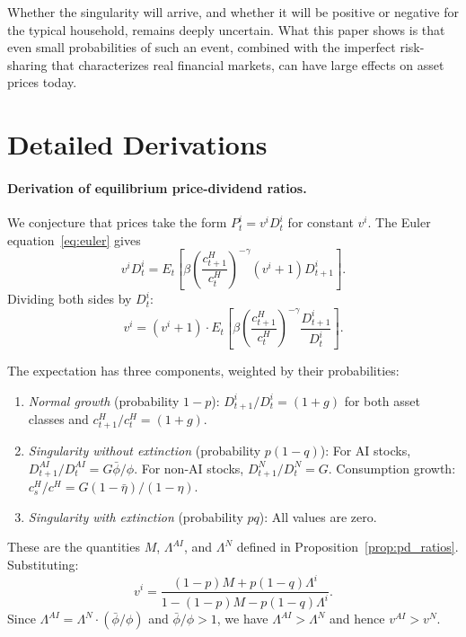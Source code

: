 \documentclass[12pt]{article}
\begin{document}
Whether the singularity will arrive, and whether it will be positive or negative for the typical household, remains deeply uncertain. What this paper shows is that even small probabilities of such an event, combined with the imperfect risk-sharing that characterizes real financial markets, can have large effects on asset prices today.

\appendix
\section{Detailed Derivations}

\paragraph{Derivation of equilibrium price-dividend ratios.}

We conjecture that prices take the form $P_t^i = v^i D_t^i$ for constant $v^i$. The Euler equation~\eqref{eq:euler} gives
\[
v^i D_t^i = E_t\left[\beta \left(\frac{c_{t+1}^H}{c_t^H}\right)^{-\gamma} (v^i + 1) D_{t+1}^i\right].
\]
Dividing both sides by $D_t^i$:
\begin{equation}
v^i = (v^i + 1) \cdot E_t\left[\beta \left(\frac{c_{t+1}^H}{c_t^H}\right)^{-\gamma} \frac{D_{t+1}^i}{D_t^i}\right]. \label{eq:pd_derivation}
\end{equation}

The expectation has three components, weighted by their probabilities:
\begin{enumerate}
    \item \emph{Normal growth} (probability $1-p$): $D_{t+1}^i / D_t^i = (1+g)$ for both asset classes and $c_{t+1}^H / c_t^H = (1+g)$.
    \item \emph{Singularity without extinction} (probability $p(1-q)$): For AI stocks, $D_{t+1}^{AI}/D_t^{AI} = G\bar{\phi}/\phi$. For non-AI stocks, $D_{t+1}^N/D_t^N = G$. Consumption growth: $c_s^H/c^H = G(1-\bar{\eta})/(1-\eta)$.
    \item \emph{Singularity with extinction} (probability $pq$): All values are zero.
\end{enumerate}

These are the quantities $M$, $\Lambda^{AI}$, and $\Lambda^N$ defined in Proposition~\ref{prop:pd_ratios}. Substituting:
\[
v^i = \frac{(1-p)M + p(1-q)\Lambda^i}{1 - (1-p)M - p(1-q)\Lambda^i}.
\]
Since $\Lambda^{AI} = \Lambda^N \cdot (\bar{\phi}/\phi)$ and $\bar{\phi}/\phi > 1$, we have $\Lambda^{AI} > \Lambda^N$ and hence $v^{AI} > v^N$.

\printbibliography
\end{document}
